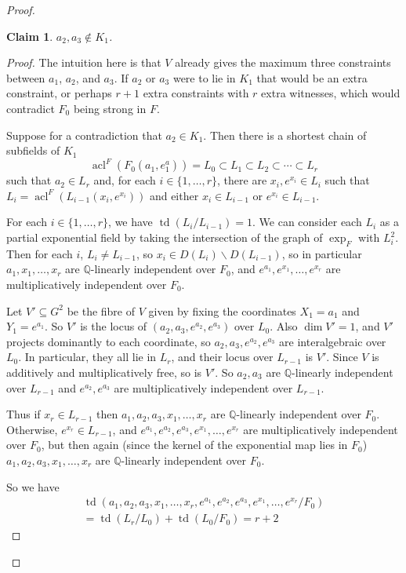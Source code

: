 \documentclass[12pt]{amsart}
\newtheorem*{claim}{Claim}
\theoremstyle{definition}
\begin{document}
\begin{proof}
\begin{claim}
 $a_2,a_3 \notin K_1$.
\end{claim}
\begin{proof}
The intuition here is that $V$ already gives the maximum three constraints between $a_1$, $a_2$, and $a_3$. If $a_2$ or $a_3$ were to lie in $K_1$ that would be an extra constraint, or perhaps $r+1$ extra constraints with $r$ extra witnesses, which would contradict $F_0$ being strong in $F$.

Suppose for a contradiction that $a_2 \in K_1$. Then there is a shortest chain of subfields of $K_1$
\[\operatorname{acl}^F(F_0(a_1,e^a_1)) = L_0 \subset L_1 \subset L_2 \subset \cdots \subset L_r\]
such that $a_2 \in L_r$ and, for each $i \in \{1,\ldots,r\}$, there are $x_i,e^{x_i} \in L_i$ such that $L_i = \operatorname{acl}^F(L_{i-1}(x_i,e^{x_i}))$ and either $x_i \in L_{i-1}$ or $e^{x_i} \in L_{i-1}$.

For each $i \in \{1,\ldots,r\}$, we have $\operatorname{td}(L_i/L_{i-1}) = 1$. We can consider each $L_i$ as a partial exponential field by taking the intersection of the graph of $\exp_F$ with $L_i^2$. Then for each $i$, $L_i \neq L_{i-1}$, so $x_i \in D(L_i) {\ensuremath{\smallsetminus}} D(L_{i-1})$, so in particular $a_1,x_1,\ldots,x_r$ are ${\ensuremath{\mathbb{Q}}}$-linearly independent over $F_0$, and 
$e^{a_1},e^{x_1},\ldots,e^{x_r}$ are multiplicatively independent over $F_0$.

Let $V'{\subseteq} G^2$ be the fibre of $V$ given by fixing the coordinates $X_1=a_1$ and $Y_1=e^{a_1}$. So $V'$ is the locus of $(a_2,a_3,e^{a_2},e^{a_3})$ over $L_0$. Also $\dim V' = 1$, and $V'$ projects dominantly to each coordinate, so $a_2,a_3,e^{a_2},e^{a_3}$ are interalgebraic over $L_0$. In particular, they all lie in $L_r$, and their locus over $L_{r-1}$ is $V'$. Since $V$ is additively and multiplicatively free, so is $V'$. So $a_2,a_3$ are ${\ensuremath{\mathbb{Q}}}$-linearly independent over $L_{r-1}$ and $e^{a_2},e^{a_3}$ are multiplicatively independent over $L_{r-1}$.

Thus if $x_r \in L_{r-1}$ then $a_1,a_2,a_3,x_1,\ldots,x_r$ are {\ensuremath{\mathbb{Q}}}-linearly independent over $F_0$. Otherwise, $e^{x_r} \in L_{r-1}$, and $e^{a_1},e^{a_2},e^{a_3},e^{x_1},\ldots,e^{x_r}$ are multiplicatively independent over $F_0$, but then again (since the kernel of the exponential map lies in $F_0$) $a_1,a_2,a_3,x_1,\ldots,x_r$ are {\ensuremath{\mathbb{Q}}}-linearly independent over $F_0$.

So we have 
\begin{multline*}
\operatorname{td}(a_1,a_2,a_3,x_1,\ldots,x_r,e^{a_1},e^{a_2},e^{a_3},e^{x_1},\ldots,e^{x_r}/F_0) \\
=\operatorname{td}(L_r/L_0) + \operatorname{td}(L_0/F_0) = r + 2 
\end{multline*}


\end{proof}
\end{proof}
\end{document}
